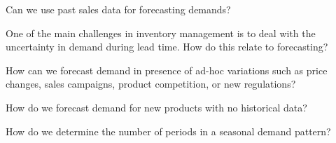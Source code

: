 \begin{exercise}
Can we use past sales data for forecasting demands?

\end{exercise}


\begin{exercise}
One of the main challenges in inventory management is to deal with the uncertainty in demand during lead time. How do this relate to forecasting?

\end{exercise}

\begin{exercise}
How can we forecast demand in presence of ad-hoc variations such as price changes, sales campaigns, product competition, or new regulations?

\end{exercise}

\begin{exercise}
How do we forecast demand for new products with no historical data?

\end{exercise}

\begin{exercise}
How do we determine the number of periods in a seasonal demand pattern? 

\end{exercise}


